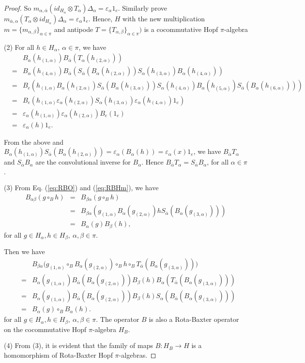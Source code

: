 \documentclass[11pt]{article}
\def\a{\alpha}
\def\b{\beta}
\def\v{\varepsilon}
\begin{document}
\begin{proof}
So $m_{\a,\bar{\a}}(id_{H_{\a}} \otimes T_\a)\Delta_\a = \v_\a 1_e$. Similarly prove $m_{\bar{\a},\a}(T_\a \otimes id_{H_{\a}})\Delta_\a = \v_\a 1_e$. 
Hence, $H$ with the new multiplication $m=\{m_{\a,\b}\}_{\a\in\pi}$ and antipode $T=\{T_{\a,\b}\}_{\a\in\pi})$  is a cocommutative Hopf $\pi$-algebra

(2) For all $h\in H_\a, ~\a\in\pi$, we have
\begin{eqnarray*}
& & B_\a(h_{(1,\a)})B_{\bar{\a}}(T_\a(h_{(2,\a)})) \\
&=& B_\a(h_{(4,\a)}) B_{\bar{\a}}(S_{\bar{\a}}(B_\a(h_{(2,\a)}))S_\a(h_{(3,\a)})B_\a(h_{(4,\a)}))  \\
&=& B_e(h_{(1,\a)}B_\a(h_{(2,\a)}) S_{\bar{\a}}(B_\a(h_{(3,\a)}))S_\a(h_{(4,\a)})B_\a(h_{(5,\a)}) S_{\bar{\a}}(B_\a(h_{(6,\a)}))) \\
&=& B_e(h_{(1,\a)} \v_\a(h_{(2,\a)}) S_\a(h_{(3,\a)}) \v_\a(h_{(4,\a)}) 1_e) \\
&=& \v_\a(h_{(1,\a)}) \v_\a(h_{(2,\a)}) B_e(1_e) \\
&=& \v_\a(h)1_e.
\end{eqnarray*}

From the above and $B_\a(h_{(1,\a)})S_{\bar{\a}}(B_\a(h_{(2,\a)}))=\v_\a(B_\a(h))=\v_\a(x)1_e$, we have $B_{\bar{\a}}T_\a$ and $S_{\bar{\a}}B_\a$ are the convolutional inverse for $B_\a$. Hence $B_{\bar{\a}}T_\a = S_{\bar{\a}}B_\a$, for all $\a\in\pi$.

(3) From Eq. (\ref{eq:RBO}) and (\ref{eq:RBHm}), we have 
\begin{eqnarray*}
 B_{\a\b}(g \circ_B h) &=& B_{\b\a}(g \circ_B h) \\
 &=& B_{\b\a}( g_{(1,\a)}B_\a(g_{(2,\a)})h S_{\bar{\a}}(B_\a(g_{(3,\a)})) ) \\
 &=& B_\a(g) B_\b(h),
\end{eqnarray*}
for all $g\in H_\a, h\in H_\b, ~\a,\b\in\pi$.

Then we have
\begin{eqnarray*}
& & B_{\b\a}\big(g_{(1,\a)}\circ_B B_\a(g_{(2,\a)})\circ_B h \circ_B T_{\bar{\a}}(B_\a(g_{(3,\a)}))\big) \\
&=& B_{\a}(g_{(1,\a)}) B_{\bar{\a}}(B_\a(g_{(2,\a)})) B_{\b}(h) B_{\a}(T_{\bar{\a}}(B_\a(g_{(3,\a)}))) \\
&=& B_{\a}(g_{(1,\a)}) B_{\bar{\a}}(B_\a(g_{(2,\a)})) B_{\b}(h) S_{\a}(B_{\bar{\a}}(B_\a(g_{(3,\a)})))  \\
&=& B_{\a}(g) \circ_B B_{\a}(h).
\end{eqnarray*}
for all $g\in H_\a, h\in H_\b, ~\a,\b\in\pi$. The operator $B$ is also a Rota-Baxter operator on the cocommutative Hopf $\pi$-algebra $H_B$.

(4) From (3), it is evident that the family of maps $B:H_B\rightarrow H$ is a homomorphism of Rota-Baxter Hopf $\pi$-algebras.
\end{proof}
\end{document}
